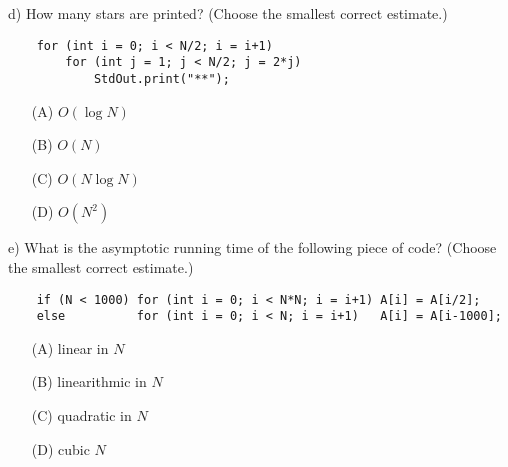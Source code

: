 \documentclass{tufte-handout}
\begin{document}
\begin{description}
\bigskip\item{d)} How many stars are printed?
         (Choose the smallest correct estimate.)
\begin{verbatim}
    for (int i = 0; i < N/2; i = i+1)
        for (int j = 1; j < N/2; j = 2*j)
            StdOut.print("**");
\end{verbatim}
      \begin{enumerate}
          \item[(A)] $O(\log N)$
          \item[(B)] $O(N)$
          \item[(C)] $O(N\log N)$
          \item[(D)] $O(N^2)$
      \end{enumerate}
\bigskip
\item{e)} What is the asymptotic running time of the following piece
  of code?
         (Choose the smallest correct estimate.)
\begin{verbatim}
    if (N < 1000) for (int i = 0; i < N*N; i = i+1) A[i] = A[i/2];
    else          for (int i = 0; i < N; i = i+1)   A[i] = A[i-1000];
\end{verbatim}
      \begin{enumerate}
          \item[(A)] linear in $N$
          \item[(B)] linearithmic in $N$
          \item[(C)] quadratic in $N$
          \item[(D)] cubic $N$
      \end{enumerate} 
\end{description}
\end{document}
